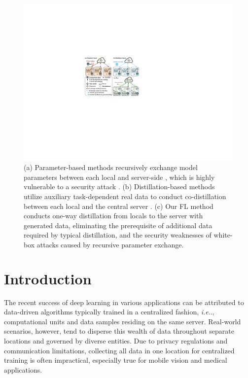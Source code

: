 \documentclass[letterpaper]{article} %
\makeatletter
\DeclareRobustCommand\onedot{\futurelet\@let@token\@onedot}
\def\@onedot{\ifx\@let@token.\else.\null\fi\xspace}
\def\ie{\emph{i.e}\onedot} \def\Ie{\emph{I.e}\onedot}
\makeatother
\begin{document}
\begin{figure}[h]
\centering
\includegraphics[width=\linewidth]{fig/fig1.pdf}
\caption{ (a) Parameter-based methods recursively exchange model parameters between each local and server-side \cite{mcmahan2017communication,li2018federated, karimireddy2019scaffold}, which is highly vulnerable to a security attack \cite{zhu2019deep}. 
(b) Distillation-based methods utilize auxiliary task-dependent real data to conduct co-distillation between each local and the central server \cite{li2019fedmd, gong2022preserving}. 
(c) Our FL method conducts one-way distillation from locals to the server with generated data, eliminating the prerequisite of additional data required by typical distillation, and the security weaknesses of white-box attacks caused by recursive parameter exchange.
} 
\label{fig1}
\end{figure}

\section{Introduction}
\label{sec:intro}
The recent success of deep learning in various applications can be attributed to data-driven algorithms typically trained in a centralized fashion, \ie, computational units and data samples residing on the same server. Real-world scenarios, however, tend to disperse this wealth of data throughout separate locations and governed by diverse entities. Due to privacy regulations and communication limitations, collecting all data in one location for centralized training is often impractical, especially true for mobile vision and medical applications.
\end{document}
